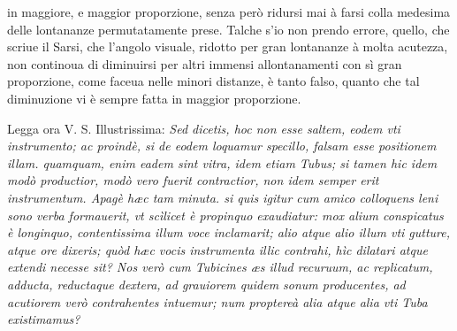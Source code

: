 \documentclass[11pt,twoside,openany]{book}
\begin{document}
in maggiore, e maggior proporzione, senza però ridursi mai à farsi colla medesima delle lontananze permutatamente prese. Talche s'io non prendo errore, quello, che scriue il Sarsi, che l'angolo visuale, ridotto per gran lontananze à molta acutezza, non continoua di diminuirsi per altri immensi allontanamenti con sì gran proporzione, come faceua nelle minori distanze, è tanto falso, quanto che tal diminuzione vi è sempre fatta in maggior proporzione.



\par\bigskip\noindent{}\enspace Legga ora V. S. Illustrissima: \textit{Sed dicetis, hoc non esse saltem, eodem vti instrumento; ac proindè, si de eodem loquamur specillo, falsam esse positionem illam. quamquam, enim eadem sint vitra, idem etiam Tubus; si tamen hic idem modò productior, modò vero fuerit contractior, non idem semper erit instrumentum. Apagè hæc tam minuta. si quis igitur cum amico colloquens leni sono verba formauerit, vt scìlicet è propinquo exaudiatur: mox alium conspicatus è longinquo, contentissima illum voce inclamarit; alio atque alio illum vti gutture, atque ore dixeris; quòd hæc vocis instrumenta illic contrahi, hìc dilatari atque extendi necesse sit? Nos verò cum Tubicines æs illud recuruum, ac replicatum, adducta, reductaque dextera, ad grauiorem quidem sonum producentes, ad acutiorem verò contrahentes intuemur; num proptereà alia atque alia vti Tuba existimamus?}
\end{document}
